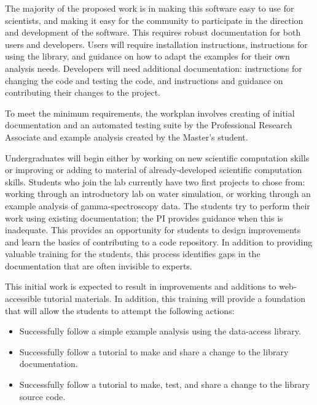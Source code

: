 The majority of the proposed work is in making this software easy to use for scientists, and making it easy for the community to participate in the direction and development of the software.  This requires robust documentation for both users and developers.  Users will require installation instructions, instructions for using the library, and guidance on how to adapt the examples for their own analysis needs.  Developers will need additional documentation: instructions for changing the code and testing the code, and instructions and guidance on contributing their changes to the project.

To meet the minimum requirements, the workplan involves creating of initial documentation and an automated testing suite by the Professional Research Associate and example analysis created by the Master's student.

Undergraduates will begin either by working on new scientific computation skills or improving or adding to material of already-developed scientific computation skills.  Students who join the lab currently have two first projects to chose from: working through an introductory lab on water simulation, or working through an example analysis of gamma-spectroscopy data.  The students try to perform their work using existing documentation; the PI provides guidance when this is inadequate.  This provides an opportunity for students to design improvements and learn the basics of contributing to a code repository.  In addition to providing valuable training for the students, this process identifies gaps in the documentation that are often invisible to experts.

This initial work is expected to result in improvements and additions to web-accessible tutorial materials.  In addition, this training will provide a foundation that will allow the students to attempt the following actions:

\begin{itemize}
    \item Successfully follow a simple example analysis using the data-access library.
    \item Successfully follow a tutorial to make and share a change to the library documentation.
    \item Successfully follow a tutorial to make, test, and share a change to the library source code.
\end{itemize}

